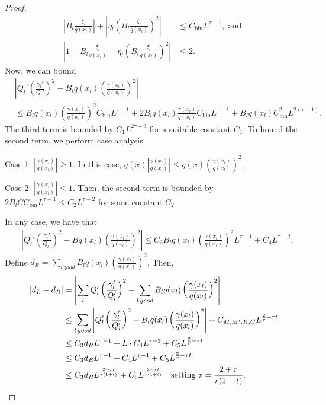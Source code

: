 \documentclass{article}
\newcommand{\bin}{\text{bin}}
\begin{document}
\begin{proof}
\begin{align*}
 \left| B_l \frac{\xi_l}{q(x_l)} \right|  + \left| \eta_l ( B_l \frac{\xi_l}{q(x_l)} )^2 \right| &\leq C_\bin L^{\tau - 1}, \text{ and } \\
 \left| 1 - B_l \frac{\xi_l}{q(x_l)} + \eta_l ( B_l \frac{\xi_l}{q(x_l)} )^2 \right| &\leq 2.
\end{align*}
Now, we can bound
\begin{align*}
& \left| Q_l' \left( \frac{\gamma_l'}{Q_l'} \right)^2 
         - B_l q(x_l) \left( \frac{\gamma(x_l)}{q(x_l)} \right)^2 \right| \\
& \leq B_l q(x_l) \left( \frac{\gamma(x_l)}{q(x_l)} \right)^2 C_\bin L^{\tau - 1} +
       2 B_l q(x_l) \frac{\gamma(x_l)}{q(x_l)}C_\bin  L^{\tau - 1} +
        B_l q(x_l) C_\bin^2 L^{2(\tau-1)}. 
\end{align*}
The third term is bounded by $C_1 L^{2\tau - 3}$ for a suitable constant $C_1$. To bound the second term, we perform case analysis. 

Case 1: $\left|\frac{\gamma(x_l)}{q(x_l)}\right| \geq 1$. In this case, 
$q(x) \left| \frac{\gamma(x_l)}{q(x_l)} \right| 
  \leq q(x) \left( \frac{\gamma(x_l)}{q(x_l)} \right)^2 $.

Case 2: $\left| \frac{\gamma(x_l)}{q(x_l)} \right| \leq 1$. Then, the second term is bounded by $2 B_l CC_\bin L^{\tau - 1 } \leq C_2 L^{\tau - 2}$ for some constant $C_2$

In any case, we have that
\begin{align*}
& \left| Q_l' \left( \frac{\gamma_l'}{Q_l'} \right)^2 
         - B q(x_l) \left( \frac{\gamma(x_l)}{q(x_l)} \right)^2 \right| 
  \leq C_3 B_l q(x_l) \left( \frac{\gamma(x_l)}{q(x_l)} \right)^2  L^{\tau - 1} +
        C_4 L^{\tau - 2}.
\end{align*}
Define $d_R = \sum_{l \, good} B_l q(x_l) \left( \frac{\gamma(x_l)}{q(x_l)} \right)^2$. Then,
\begin{align*}
  |d_L - d_R| &= \left| \sum_l Q_l' \left( \frac{\gamma_l'}{Q_l'} \right)^2 - \sum_{l \, good} B_l q(x_l) \left( \frac{\gamma(x_l)}{q(x_l)} \right)^2 \right| \\
  &\leq \sum_{l \, good} \left| Q_l' \left( \frac{\gamma_l'}{Q_l'} \right)^2 - B_l q(x_l) \left( \frac{\gamma(x_l)}{q(x_l)} \right)^2 \right| + C_{M, M', K, C} L^{\frac{2}{r} - \tau t} \\
  &\leq C_3 d_R L^{\tau - 1}
       + L \cdot C_4 L^{\tau - 2}  + C_5 L^{\frac{2}{r} - \tau t} \\
  &\leq  C_3 d_R L^{\tau - 1} 
       +   C_4 L^{\tau - 1}  + C_{5} L^{\frac{2}{r} - \tau t} \\
 &\leq C_3 d_R L^{\frac{2 - rt}{r(1+t)}} 
       +   C_{6} L^{\frac{2 - rt}{r(1+t)} }
                     \quad \textrm{setting $\tau= \frac{2 + r}{r(1+t)}. $} 
\end{align*}


\end{proof}
\end{document}
